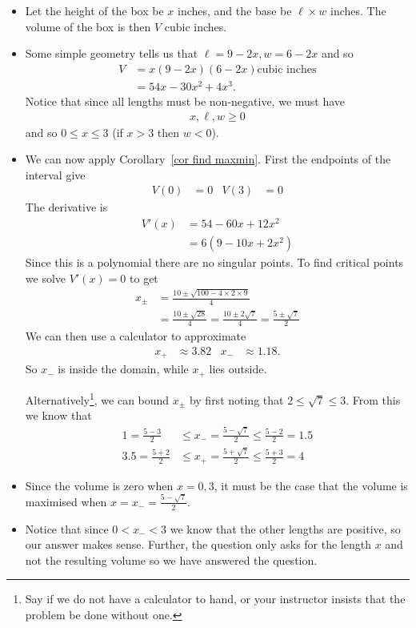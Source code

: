 \begin{eg}
\begin{itemize}
\item Let the height of the box be $x$ inches, and the base be $\ell \times w$ inches.
The volume of the box is then $V$ cubic inches.
\item Some simple geometry tells us that $\ell = 9-2x, w=6-2x$ and so
\begin{align*}
V &= x(9-2x)(6-2x) \text{cubic inches}\\
  &= 54x-30x^2+4x^3.
\end{align*}
Notice that since all lengths must be non-negative, we must have
\begin{align*}
  x,\ell,w \geq 0
\end{align*}
and so $0 \leq x \leq 3$ (if $x>3$ then $w<0$).
\item We can now apply Corollary~\ref{cor find maxmin}. First the endpoints of the
interval give
\begin{align*}
  V(0) &= 0 & V(3) &= 0
\end{align*}
The derivative is
\begin{align*}
  V'(x) &= 54 - 60x +12x^2 \\
  &= 6(9-10x+2x^2)
\end{align*}
Since this is a polynomial there are no singular points. To find critical points we solve
$V'(x) = 0$ to get
\begin{align*}
  x_\pm &= \frac{10 \pm \sqrt{100 - 4\times2\times9}}{4} \\
  &= \frac{10 \pm \sqrt{28}}{4} = \frac{10 \pm 2\sqrt{7}}{4} = \frac{5 \pm \sqrt{7}}{2}
\end{align*}
We can then use a calculator to approximate
\begin{align*}
  x_+ &\approx 3.82 & x_- &\approx 1.18.
\end{align*}
So $x_-$ is inside the domain, while $x_+$ lies outside.

Alternatively\footnote{Say if we do not have a calculator to hand, or your instructor
insists that the problem be done without one.}, we can bound $x_\pm$ by first noting that
$2 \leq \sqrt{7} \leq 3$. From this we know that
\begin{align*}
  1=\frac{5-3}{2} & \leq x_- = \frac{5 - \sqrt{7}}{2} \leq \frac{5-2}{2} = 1.5 \\
  3.5=\frac{5+2}{2} & \leq x_+ = \frac{5 + \sqrt{7}}{2} \leq \frac{5+3}{2} = 4
\end{align*}

\item Since the volume is zero when $x=0,3$, it must be the case that the volume is
maximised when $x = x_- = \frac{5 - \sqrt{7}}{2}$.

\item Notice that since $0 < x_- <3$ we know that the other lengths are positive, so our
answer makes sense. Further, the question only asks for the length $x$ and not the
resulting volume so we have answered the question.
\end{itemize}
\end{eg}

